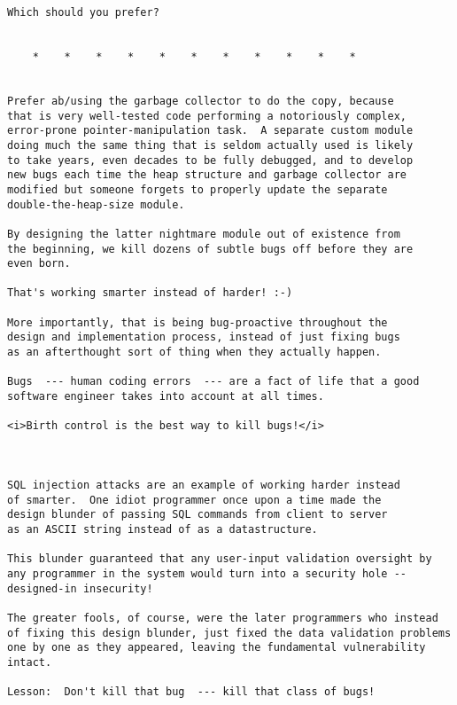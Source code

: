 \begin{verbatim}
Which should you prefer? 


    *    *    *    *    *    *    *    *    *    *    * 


Prefer ab/using the garbage collector to do the copy, because 
that is very well-tested code performing a notoriously complex, 
error-prone pointer-manipulation task.  A separate custom module 
doing much the same thing that is seldom actually used is likely 
to take years, even decades to be fully debugged, and to develop 
new bugs each time the heap structure and garbage collector are 
modified but someone forgets to properly update the separate 
double-the-heap-size module. 

By designing the latter nightmare module out of existence from 
the beginning, we kill dozens of subtle bugs off before they are 
even born. 

That's working smarter instead of harder! :-) 

More importantly, that is being bug-proactive throughout the 
design and implementation process, instead of just fixing bugs 
as an afterthought sort of thing when they actually happen. 

Bugs  --- human coding errors  --- are a fact of life that a good 
software engineer takes into account at all times. 

<i>Birth control is the best way to kill bugs!</i> 



SQL injection attacks are an example of working harder instead 
of smarter.  One idiot programmer once upon a time made the 
design blunder of passing SQL commands from client to server 
as an ASCII string instead of as a datastructure. 

This blunder guaranteed that any user-input validation oversight by 
any programmer in the system would turn into a security hole -- 
designed-in insecurity! 

The greater fools, of course, were the later programmers who instead 
of fixing this design blunder, just fixed the data validation problems 
one by one as they appeared, leaving the fundamental vulnerability intact. 

Lesson:  Don't kill that bug  --- kill that class of bugs! 








\end{verbatim}
